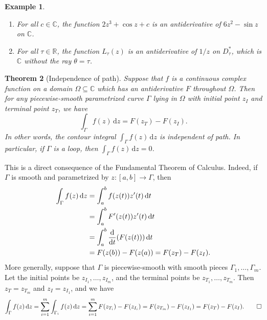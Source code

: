 \documentclass[10pt]{article}
\makeatletter
\newcommand{\R}{\mathbb{R}}
\newcommand{\C}{\mathbb{C}}
\newcommand{\dd}{\,\mathrm{d}}
\theoremstyle{newstyle}
\newtheorem{thm}{Theorem}[section]
\newtheorem{exmp}[thm]{Example}
\newenvironment{pf}[1][\proofname]{\par
  \pushQED{\qed}%
  \normalfont \topsep0\p@\relax
  \trivlist
  \item[\hskip\labelsep\scshape
  #1\@addpunct{.}]\ignorespaces
}{%
  \popQED\endtrivlist\@endpefalse
}
\makeatother
\begin{document}
\begin{exmp}~
\begin{enumerate}[(1)]
    \item For all $c \in \C$, the function $2z^3 + \cos z + c$ is an antiderivative of 
    $6z^2 - \sin z$ on $\C$. 
    \item For all $\tau \in \R$, the function $L_\tau(z)$ is an antiderivative of $1/z$ on 
    $D_\tau^*$, which is $\C$ without the ray $\theta = \tau$. 
\end{enumerate}
\end{exmp}

\begin{thm}[Independence of path]
Suppose that $f$ is a continuous complex function on a domain $\Omega \subseteq \C$ which 
has an antiderivative $F$ throughout $\Omega$. Then for any piecewise-smooth parametrized curve 
$\Gamma$ lying in $\Omega$ with initial point $z_I$ and terminal point $z_T$, we have 
\[ \int_\Gamma f(z)\dd z = F(z_T) - F(z_I). \]
In other words, the contour integral $\int_\Gamma f(z)\dd z$ is independent of path. 
In particular, if $\Gamma$ is a loop, then $\int_\Gamma f(z)\dd z = 0$. 
\end{thm}
\begin{pf}
This is a direct consequence of the Fundamental Theorem of Calculus. Indeed, if $\Gamma$ is smooth 
and parametrized by $z : [a, b] \to \Gamma$, then 
\begin{align*}
    \int_\Gamma f(z)\dd z &= \int_a^b f(z(t))z'(t)\dd t \\ 
    &= \int_a^b F'(z(t))z'(t)\dd t \\
    &= \int_a^b \frac{\rm d}{{\rm d}t} (F(z(t))) \dd t \\
    &= F(z(b)) - F(z(a)) = F(z_T) - F(z_I).
\end{align*} 
More generally, suppose that $\Gamma$ is piecewise-smooth with smooth pieces 
$\Gamma_1, \dots, \Gamma_m$. Let the initial points be $z_{I_1}, \dots, z_{I_m}$, 
and the terminal points be $z_{T_1}, \dots, z_{T_m}$. Then $z_T = z_{T_m}$ and 
$z_I = z_{I_1}$, and we have 
\[ \int_\Gamma f(z)\dd z = \sum_{i=1}^m \int_{\Gamma_i} f(z)\dd z 
= \sum_{i=1}^m F(z_{T_i}) - F(z_{I_i}) = F(z_{T_m}) - F(z_{I_1}) = F(z_T) - F(z_I). \qedhere \]
\end{pf}
\end{document}
